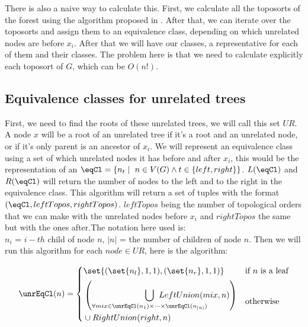 There is also a naive way to calculate this. First, we calculate all the toposorts of the forest using the algorithm proposed in \cite{KNUTH1974153}. After that, we can iterate over the toposorts and assign them to an equivalence class, depending on which unrelated nodes are before $x_i$. After that we will have our classes, a representative for each of them and their classes. The problem here is that we need to calculate explicitly each toposort of $G$, which can be $O(n!)$. 


\subsection{Equivalence classes for unrelated trees}


First, we need to find the roots of these unrelated trees, we will call this set $UR$. A node $x$ will be a root of an unrelated tree if it's a root and an unrelated node, or if it's only parent is an ancestor of $x_i$. We will represent an equivalence class using a set of which unrelated nodes it has before and after $x_i$, this would be the representation of an $\eqCl = \{ n_t \mid \ n \in V(G) \land t \in  \{ left, right\} \}$. $L(\eqCl)$ and $R(\eqCl)$ will return the number of nodes to the left and to the right in the equivalence class. This algorithm will return a set of tuples with the format $(\eqCl, leftTopos, rightTopos)$. $leftTopos$ being the number of topological orders that we can make with the unrelated nodes before $x_i$ and $rightTopos$ the same but with the ones after.The notation here used is: \\
$n_i$ = $i-th$ child of node $n$, $|n|$ = the number of children of node $n$.
Then we will run this algorithm for each $node \in UR$, here is the algorithm: 

\label{formula:unrelated_equiv_classes}


\[
    \unrEqCl(n) = 
    \begin{cases} 
    \set{(\set{n_l}, 1, 1), (\set{n_r},1,1)} & \text{if $n$ is a leaf} \\[1ex]
    \begin{aligned}
    &\left( \bigcup_{\forall mix \in \unrEqCl(n_1) \times \dots \times \unrEqCl(n_{|n|})} \hspace{-6em} LeftUnion(mix,n)\right) \\
    &\cup RightUnion(right,n)
    \end{aligned} & \text{otherwise}
    \end{cases}
\]


